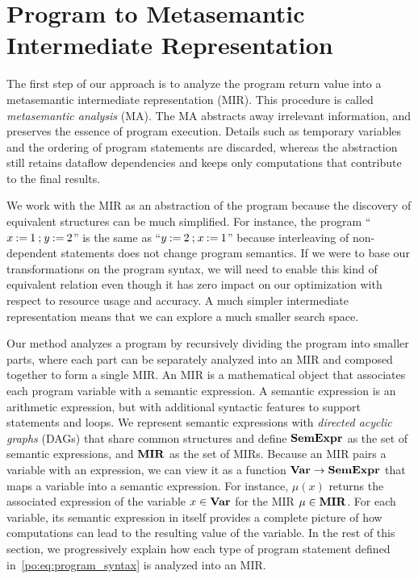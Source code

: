 \section{Program to Metasemantic Intermediate Representation}
\label{po:sec:program_to_mir}

The first step of our approach is to analyze the program return value
into a metasemantic intermediate representation (MIR).  This procedure is
called \emph{metasemantic analysis} (MA).  The MA abstracts away irrelevant
information, and preserves the essence of program execution.  Details such
as temporary variables and the ordering of program statements are discarded,
whereas the abstraction still retains dataflow dependencies and keeps only
computations that contribute to the final results.

We work with the MIR as an abstraction of the program because the discovery of
equivalent structures can be much simplified.  For instance, the program ``$x
\mathbin{:=} 1 \mathbin{;} y \mathbin{:=} 2$'' is the same as ``$y \mathbin{:=} 2 \mathbin{;} x
\mathbin{:=} 1$'' because interleaving of non-dependent statements does not change
program semantics.  If we were to base our transformations on the program
syntax, we will need to enable this kind of equivalent relation even though
it has zero impact on our optimization with respect to resource usage and
accuracy.  A much simpler intermediate representation means that we can explore
a much smaller search space.

Our method analyzes a program by recursively dividing the program into
smaller parts, where each part can be separately analyzed into an MIR and
composed together to form a single MIR\@.  An MIR is a mathematical object
that associates each program variable with a semantic expression.  A semantic
expression is an arithmetic expression, but with additional syntactic features
to support \iflit{} statements and \whilelit{} loops.  We represent semantic
expressions with \emph{directed acyclic graphs} (DAGs) that share common
structures and define $\mathbf{SemExpr}$ as the set of semantic expressions, and
$\mathbf{MIR}$ as the set of MIRs.  Because an MIR pairs a variable with an
expression, we can view it as a function $\mathbf{Var} \to \mathbf{SemExpr}$ that maps
a variable into a semantic expression.  For instance, $\mu(x)$ returns the
associated expression of the variable $x \in \mathbf{Var}$ for the MIR $\mu \in
\mathbf{MIR}$.  For each variable, its semantic expression in itself provides a
complete picture of how computations can lead to the resulting value of the
variable.  In the rest of this section, we progressively explain how each type
of program statement defined in~\eqref{po:eq:program_syntax} is analyzed into
an MIR\@.

